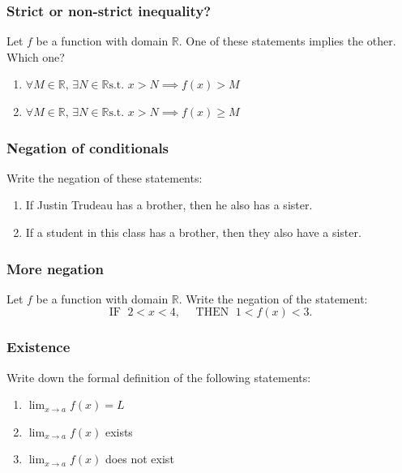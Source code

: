 \begin{frame}
	\frametitle{Strict or non-strict inequality?}

	Let $f$ be a function with domain $\mathbb{R}$. One of these statements implies
	the other. Which one?

	\begin{enumerate}
		\item $\displaystyle \forall M \in \mathbb{R}, \, \exists N \in \mathbb{R}\text{
			s.t. }x>N \implies f(x) > M$

		\item $\displaystyle \forall M \in \mathbb{R}, \, \exists N \in \mathbb{R}\text{
			s.t. }x>N \implies f(x) \geq M$
	\end{enumerate}
\end{frame}

\begin{frame}
	\frametitle{Negation of conditionals}

	Write the negation of these statements:
	\begin{enumerate}
		\item If Justin Trudeau has a brother, then he also has a sister.

		\item If a student in this class has a brother, then they also have a sister.
	\end{enumerate}
\end{frame}

\begin{frame}
	\frametitle{More negation}

	Let $f$ be a function with domain $\mathbb{R}$. Write the negation of the statement:
	\begin{equation*}
		\text{IF }\; 2<x<4, \quad \text{ THEN }\; 1<f(x)<3.
	\end{equation*}
\end{frame}

\begin{frame}
	\frametitle{Existence}

	Write down the formal definition of the following statements:

	\vfill
	\begin{enumerate}
		\item $\displaystyle \lim_{x \to a}f(x) = L$
			\vfill

		\item $\displaystyle \lim_{x \to a}f(x)$ exists

			\vfill

		\item $\displaystyle \lim_{x \to a}f(x)$ does not exist
	\end{enumerate}

	\vfill
\end{frame}

